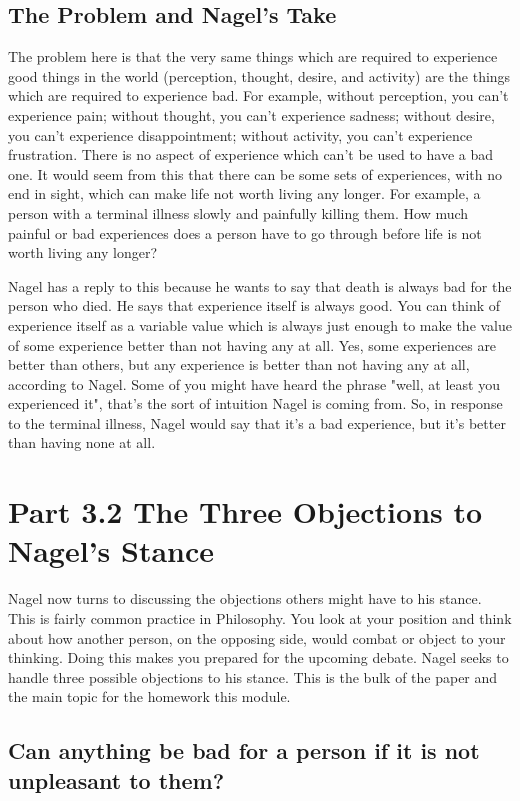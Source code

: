 \subsection{The Problem and Nagel's Take}
The problem here is that the very same things which are required to experience good things in the world (perception, thought, desire, and activity) are the things which are required to experience bad. For example, without perception, you can't experience pain; without thought, you can't experience sadness; without desire, you can't experience disappointment; without activity, you can't experience frustration. There is no aspect of experience which can't be used to have a bad one. It would seem from this that there can be some sets of experiences, with no end in sight, which can make life not worth living any longer. For example, a person with a terminal illness slowly and painfully killing them. How much painful or bad experiences does a person have to go through before life is not worth living any longer?

Nagel has a reply to this because he wants to say that death is always bad for the person who died. He says that experience itself is always good. You can think of experience itself as a variable value which is always just enough to make the value of some experience better than not having any at all. Yes, some experiences are better than others, but any experience is better than not having any at all, according to Nagel. Some of you might have heard the phrase "well, at least you experienced it", that's the sort of intuition Nagel is coming from. So, in response to the terminal illness, Nagel would say that it's a bad experience, but it's better than having none at all.  

\section{Part 3.2 The Three Objections to Nagel's Stance}
Nagel now turns to discussing the objections others might have to his stance. This is fairly common practice in Philosophy. You look at your position and think about how another person, on the opposing side, would combat or object to your thinking. Doing this makes you prepared for the upcoming debate. Nagel seeks to handle three possible objections to his stance. This is the bulk of the paper and the main topic for the homework this module.

\subsection{Can anything be bad for a person if it is not unpleasant to them?}

